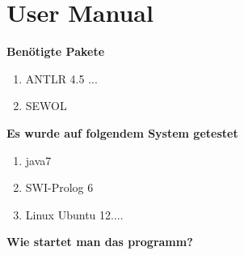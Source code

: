 
\chapter{User Manual} %

\label{UserManual} %


\textbf{Benötigte Pakete}
\begin{enumerate}
\item ANTLR 4.5 ...
\item SEWOL
\end{enumerate}

\textbf{Es wurde auf folgendem System getestet}
\begin{enumerate}
\item java7
\item SWI-Prolog 6
\item Linux Ubuntu 12....
\end{enumerate}

\textbf{Wie startet man das programm?}


